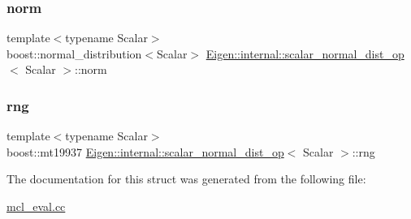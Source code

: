 \subsubsection{\texorpdfstring{norm}{norm}}
{\footnotesize\ttfamily template$<$typename Scalar$>$ \\
boost\+::normal\+\_\+distribution$<$Scalar$>$ \hyperlink{structEigen_1_1internal_1_1scalar__normal__dist__op}{Eigen\+::internal\+::scalar\+\_\+normal\+\_\+dist\+\_\+op}$<$ Scalar $>$\+::norm\hspace{0.3cm}{\ttfamily [mutable]}}

\mbox{\label{structEigen_1_1internal_1_1scalar__normal__dist__op_aa088a6e6b0b17b44a1e409fd8e024969}} 
\subsubsection{\texorpdfstring{rng}{rng}}
{\footnotesize\ttfamily template$<$typename Scalar$>$ \\
boost\+::mt19937 \hyperlink{structEigen_1_1internal_1_1scalar__normal__dist__op}{Eigen\+::internal\+::scalar\+\_\+normal\+\_\+dist\+\_\+op}$<$ Scalar $>$\+::rng\hspace{0.3cm}{\ttfamily [static]}}



The documentation for this struct was generated from the following file\+:\begin{DoxyCompactItemize}
\item 
\hyperlink{mcl__eval_8cc}{mcl\+\_\+eval.\+cc}\end{DoxyCompactItemize}
